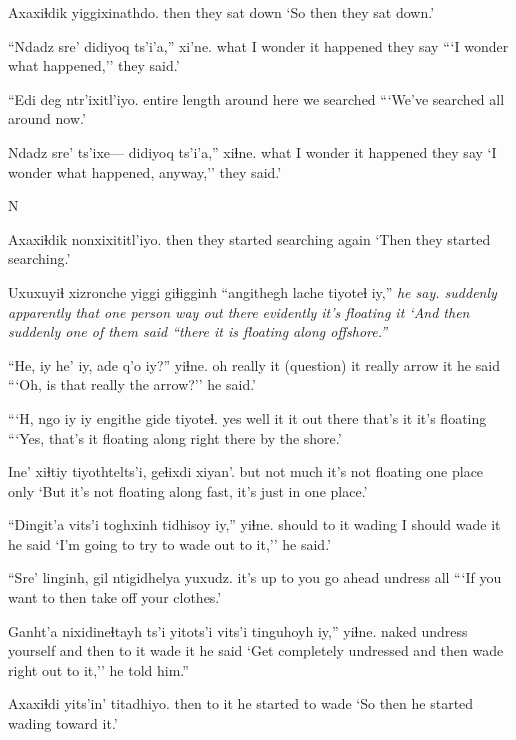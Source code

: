 \documentclass[12pt]{article}
\begin{document}
\gll Axaxiɬdik yiggixinathdo. 
then {they sat down}
\glt `So then they sat down.' 
\glend

\gll ``Ndadz sre' didiyoq ts'i'a,'' xi'ne.
what {I wonder} {it happened} {} {they say}
\glt ```I wonder what happened,'' they said.'
\glend

\gll ``Edi deg ntr'ixitl'iyo. 
{entire length} {around here} {we searched}
\glt ```We've searched all around now.'
\glend

\gll Ndadz sre' ts'ixe--- didiyoq ts'i'a,'' xiɬne. 
what {I wonder} {} {it happened} {} {they say}
\glt `I wonder what happened, anyway,'' they said.' 
\glend

N

\gll Axaxiɬdik nonxixititl'iyo.
then {they started searching again}
\glt `Then they started searching.' 
\glend

\gll Uxuxuyiɬ xizronche yiggi giɬigginh ``angithegh lache tiyoteɬ iy,'' \em {he say. }
suddenly apparently that {one person} {way out there} evidently {it's floating} it
\glt `And then suddenly one of them said ``there it is floating along offshore.''
\glend

\gll ``He, iy he' iy, ade q'o iy?'' yiɬne. 
{oh really} it {(question)} it {really} arrow it {he said}
\glt ```Oh, is that really the arrow?'' he said.'
\glend

\gll ```H, ngo iy iy engithe gide tiyoteɬ. 
yes well it it {out there} {that's it} {it's floating}
\glt ```Yes, that's it floating along right there by the shore.'
\glend

\gll Ine' xiɬtiy tiyothtelts'i, geɬixdi xiyan'. 
but {not much} {it's not floating} {one place} only
\glt `But it's not floating along fast, it's just in one place.' 
\glend

\gll ``Dingit'a vits'i toghxinh tidhisoy iy,'' yiɬne. 
should {to it} wading {I should wade} it {he said}
\glt `I'm going to try to wade out to it,'' he said.' 
\glend

\gll ``{Sre' linginh}, gil ntigidhelya yuxudz. 
{it's up to you} {go ahead} {undress} all
\glt ```If you want to then take off your clothes.' 
\glend

\gll Ganht'a nixidineɬtayh ts'i yitots'i vits'i tinguhoyh iy,'' yiɬne. 
naked {undress yourself} and then {to it} {wade} it {he said}
\glt `Get completely undressed and then wade right out to it,'' he told him.'' 
\glend

\gll Axaxiɬdi yits'in' titadhiyo. 
then {to it} {he started to wade}
\glt `So then he started wading toward it.' 
\glend
\end{document}
